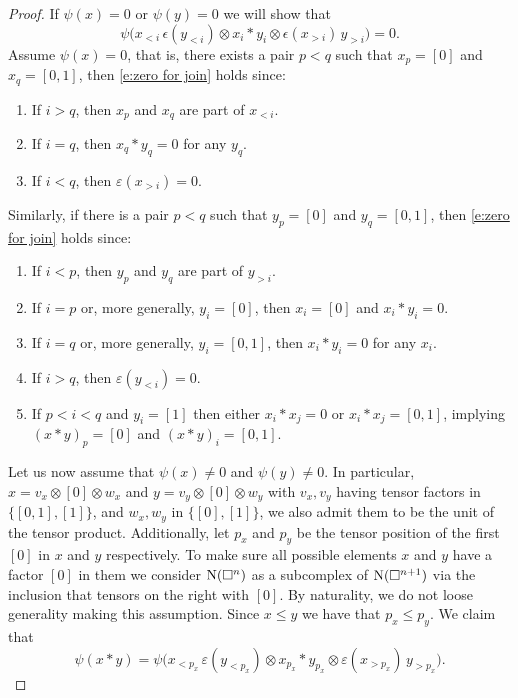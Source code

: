 \begin{proof}
	If $\psi(x) = 0$ or $\psi(y) = 0$ we will show that
	\begin{equation} \label{e:zero for join}
	\psi \big( x_{<i}\, \epsilon(y_{<i}) \otimes x_i \ast y_i \otimes \epsilon(x_{>i}) \, y_{>i} \big) = 0.
	\end{equation}
	Assume $\psi(x) = 0$, that is, there exists a pair $p < q$ such that $x_p = [0]$ and $x_q = [0,1]$, then \eqref{e:zero for join} holds since:
	\begin{enumerate}
		\item If $i > q$, then $x_p$ and $x_q$ are part of $x_{<i}$.
		\item If $i = q$, then $x_q \ast y_q = 0$ for any $y_q$.
		\item If $i < q$, then $\varepsilon(x_{>i}) = 0$.
	\end{enumerate}
	Similarly, if there is a pair $p < q$ such that $y_p = [0]$ and $y_q = [0,1]$,  then \eqref{e:zero for join} holds since:
	\begin{enumerate}
		\item If $i < p$, then $y_p$ and $y_q$ are part of $y_{>i}$.
		\item If $i = p$ or, more generally, $y_i = [0]$, then $x_i = [0]$ and $x_i \ast y_i = 0$.
		\item If $i = q$ or, more generally, $y_i = [0,1]$, then $x_i \ast y_i = 0$ for any $x_i$.
		\item If $i > q$, then $\varepsilon(y_{<i}) = 0$.
		\item If $p < i < q$ and $y_i = [1]$ then either $x_i \ast x_j = 0$ or $x_i \ast x_j = [0,1]$, implying $(x \ast y)_p = [0]$ and $(x \ast y)_i = [0,1]$.
	\end{enumerate}
	Let us now assume that $\psi(x) \neq 0$ and $\psi(y) \neq 0$.
	In particular, $x = v_x \otimes [0] \otimes w_x$ and $y = v_y \otimes [0] \otimes w_y$ with $v_x, v_y$ having tensor factors in $\{[0,1], [1]\}$, and $w_x, w_y$ in $\{[0], [1]\}$, we also admit them to be the unit of the tensor product.
	Additionally, let $p_x$ and $p_y$ be the tensor position of the first $[0]$ in $x$ and $y$ respectively.
	To make sure all possible elements $x$ and $y$ have a factor $[0]$ in them we consider $\operatorname{N}(\square^n)$ as a subcomplex of $\operatorname{N}(\square^{n+1})$ via the inclusion that tensors on the right with $[0]$.
	By naturality, we do not loose generality making this assumption.
	Since $x \leq y$ we have that $p_x \leq p_y$.
	We claim that
	\[
	\psi(x \ast y) = \psi \big( x_{<p_x} \, \varepsilon(y_{<p_x}) \otimes x_{p_x} \ast y_{p_x} \otimes \varepsilon(x_{>p_x}) \, y_{>p_x} \big).
\]
\end{proof}
